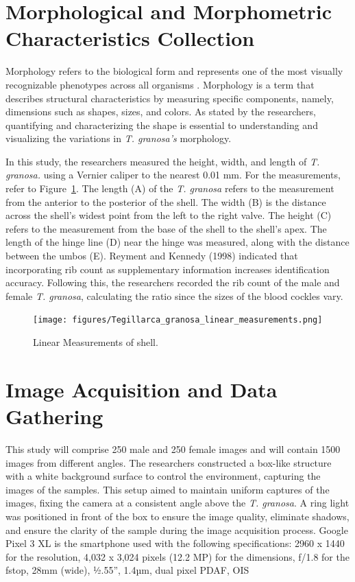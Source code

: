 \newpage
\section{Morphological and Morphometric Characteristics Collection}
\label{sec:morphochar}

Morphology refers to the biological form and represents one of the most visually recognizable phenotypes across all organisms \cite{tsutsumi2023}. Morphology is a term that describes structural characteristics by measuring specific components, namely, dimensions such as shapes, sizes, and colors. As stated by the researchers, quantifying and characterizing the shape is essential to understanding and visualizing the variations in \textit{T. granosa’s} morphology. 

In this study, the researchers measured the height, width, and length of \textit{T. granosa.} using a Vernier caliper to the nearest 0.01 mm. For the measurements, refer to Figure~\ref{fig:linear_measurements}. The length (A) of the \textit{T. granosa} refers to the measurement from the anterior to the posterior of the shell. The width (B) is the distance across the shell’s widest point from the left to the right valve. The height (C) refers to the measurement from the base of the shell to the shell’s apex. The length of the hinge line (D) near the hinge was measured, along with the distance between the umbos (E). 
Reyment and Kennedy (1998) indicated that incorporating rib count as supplementary information increases identification accuracy. Following this, the researchers recorded the rib count of the male and female \textit{T. granosa}, calculating the ratio since the sizes of the blood cockles vary. 

\begin{figure}[!htbp]
	\centering
	\texttt{[image: figures/Tegillarca\_granosa\_linear\_measurements.png]}
	\caption{Linear Measurements of  \Tegillarcagranosa shell.}
	\label{fig:linear_measurements}
\end{figure}

\section{Image Acquisition and Data Gathering}
\label{sec:imageprocess}
This study will comprise 250 male and 250 female \Tgranosa images and will contain 1500 images from different angles. The researchers constructed a box-like structure with a white background surface to control the environment, capturing the images of the samples. This setup aimed to maintain uniform captures of the images, fixing the camera at a consistent angle above the \textit{T. granosa}. A ring light was positioned in front of the box to ensure the image quality, eliminate shadows, and ensure the clarity of the sample during the image acquisition process. Google Pixel 3 XL is the smartphone used with the following specifications: 2960 x 1440 for the resolution, 4,032 x 3,024 pixels (12.2 MP) for the dimensions, f/1.8 for the fstop, 28mm (wide), ½.55”, 1.4µm, dual pixel PDAF, OIS \cite{concepcion2023}

